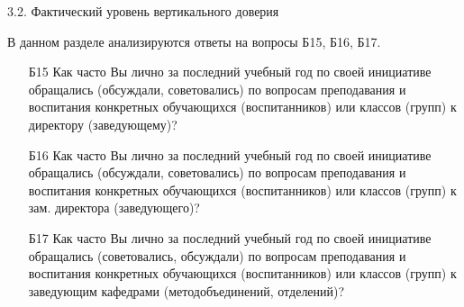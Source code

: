 \begin{frame}{3.2. Фактический уровень вертикального доверия}

\tiny

В данном разделе анализируются ответы на вопросы Б15, Б16, Б17.
\bigskip

\begin{itemize}

\item [Б15] Как часто Вы лично за последний учебный год по своей инициативе обращались (обсуждали, советовались) по вопросам преподавания и воспитания конкретных обучающихся (воспитанников) или классов (групп) к директору (заведующему)?

\item [Б16] Как часто Вы лично за последний учебный год по своей инициативе обращались (обсуждали, советовались) по вопросам преподавания и воспитания конкретных обучающихся (воспитанников) или классов (групп) к зам. директора (заведующего)?

\item [Б17] Как часто Вы лично за последний учебный год по своей инициативе обращались (советовались, обсуждали) по вопросам преподавания и воспитания конкретных обучающихся (воспитанников) или классов (групп)  к заведующим кафедрами  (методобъединений, отделений)?

\end{itemize}

\end{frame}


